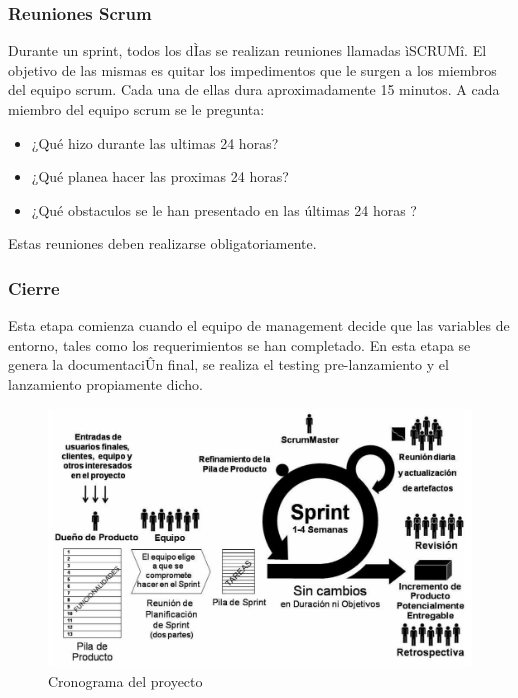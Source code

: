 \documentclass[preprint,12pt]{elsarticle}
\begin{document}
\subsubsection{\textbf{Reuniones Scrum}}
Durante un sprint, todos los dÌas se realizan reuniones llamadas ìSCRUMî. El objetivo de las mismas es quitar los impedimentos que le surgen a los miembros del equipo scrum. Cada una de ellas dura aproximadamente 15 minutos. A cada miembro del equipo scrum se le pregunta:
\begin{itemize}
\item ¿Qué hizo durante las ultimas 24 horas?
\item ¿Qué planea hacer las proximas 24 horas?
\item ¿Qué obstaculos se le han presentado en las últimas 24 horas ?
\end{itemize}
Estas reuniones deben realizarse obligatoriamente.\cite{ScrumDef}

\subsubsection{\textbf{Cierre}}
Esta etapa comienza cuando el equipo de management decide que las variables de entorno, tales como los requerimientos se han completado. En esta etapa se genera la documentaciÛn final, se realiza el testing pre-lanzamiento y el lanzamiento propiamente dicho. \cite{ScrumDef}

\begin{figure}[htb]
	\begin{center}
		\includegraphics[width=14cm]{./IMAGENES/Scrum} 
		\caption{Cronograma del proyecto}
	\end{center}
\end{figure}
\end{document}
